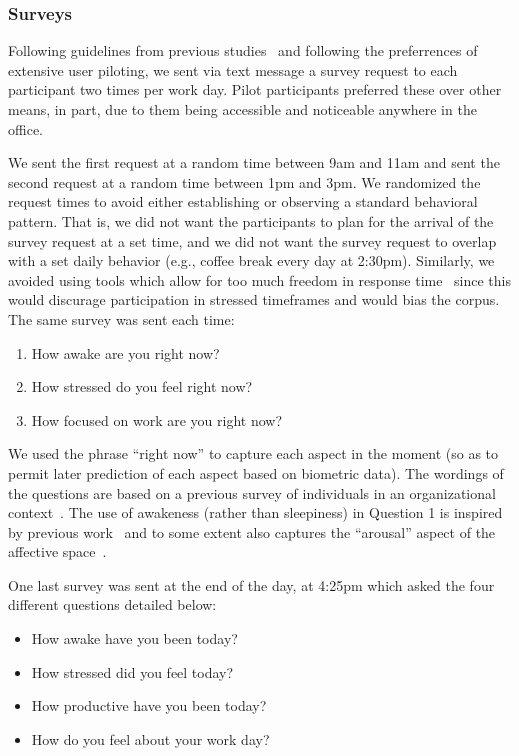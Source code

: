\subsubsection{Surveys}
\label{sec:Surveys}
Following guidelines from previous studies~\cite{Lalle16,Panwar18,Luo18} and 
following the preferrences of extensive user piloting, we sent via 
text message a survey request to each participant two times per 
work day. Pilot participants preferred these over other means, in part, due 
to them being accessible and noticeable anywhere in the office. 

We sent the 
first request at a random time between 9am and 11am 
and sent the second request at a random time between 1pm and 3pm. We 
randomized the request times to avoid either establishing or observing a 
standard behavioral pattern. That is, we did not want the participants to 
plan for the arrival of the survey request at a set time, and we did not 
want the survey request to overlap with a set daily behavior (e.g., coffee 
break every day at 2:30pm). Similarly, we avoided using tools which allow 
for too much freedom in response time~\cite{Adams18} since this would 
discurage participation in stressed timeframes and would bias the 
corpus. 
The same survey was sent each time:
\begin{enumerate}
\item How awake are you right now?
\item How stressed do you feel right now?
\item How focused on work are you right now? 
\end{enumerate}
We used the phrase ``right now'' to capture each aspect in the moment (so as to permit later prediction of each aspect based on biometric data). The wordings of the questions are based on a previous survey of individuals in an organizational context~\cite{Gloor_etal:2010}. The use of awakeness (rather than sleepiness) in Question 1 is inspired by previous work~\cite{Wilhelm_Schoebi:2007} and to some extent also captures the ``arousal'' aspect of the affective space~\cite{Russell:1980}.


One last survey was sent at the end of the day, at 4:25pm which asked the 
four different questions
detailed below:
\begin{itemize}
\item How awake have you been today?
\item How stressed did you feel today?
\item How productive have you been today?
\item How do you feel about your work day?
\end{itemize}

